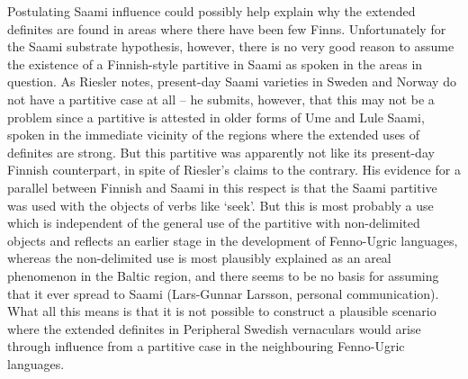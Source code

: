 \begin{styleBodytextC}
Postulating Saami influence could possibly help explain why the extended definites are found in areas where there have been few Finns. Unfortunately for the Saami substrate hypothesis, however, there is no very good reason to assume the existence of a Finnish-style partitive in Saami as spoken in the areas in question. As Riesler notes, present-day Saami varieties in Sweden and Norway do not have a partitive case at all – he submits, however, that this may not be a problem since a partitive is attested in older forms of Ume and Lule Saami, spoken in the immediate vicinity of the regions where the extended uses of  definites are strong. But this partitive was apparently not like its present-day Finnish counterpart, in spite of Riesler’s claims to the contrary. His evidence for a parallel between Finnish and Saami in this respect is that the Saami partitive was used with the objects of verbs like ‘seek’. But this is most probably a use which is independent of the general use of the partitive with non-delimited objects and reflects an earlier stage in the development of Fenno-Ugric languages, whereas the non-delimited use is most plausibly explained as an areal phenomenon in the Baltic region, and there seems to be no basis for assuming that it ever spread to Saami (Lars-Gunnar Larsson, personal communication). What all this means is that it is not possible to construct a plausible scenario where the extended definites in Peripheral Swedish vernaculars would arise through influence from a partitive case in the neighbouring Fenno-Ugric languages. 

\end{styleBodytextC}

\begin{stylecaption}

\end{stylecaption}

\begin{figure}[h]

\begin{minipage}{6.5835in}

\end{minipage}

\end{figure}

\begin{stylecaption}

\end{stylecaption}

\begin{figure}[h]

\begin{minipage}{6.5835in}

\end{minipage}

\end{figure}

